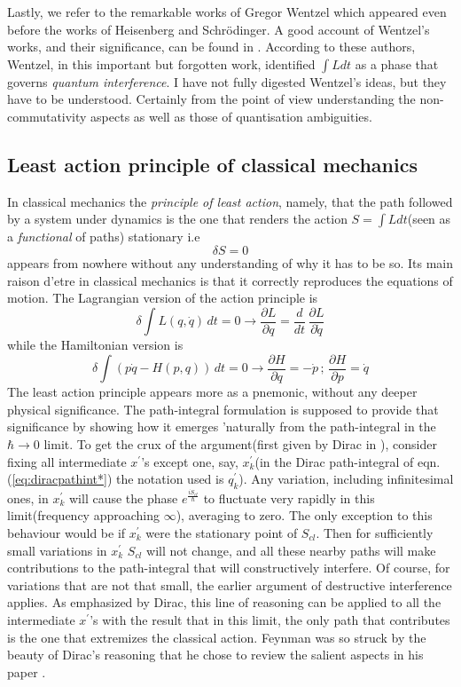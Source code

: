 \documentclass[12pt]{article}
\newcommand{\be}{\begin{equation}}
\newcommand{\ee}{\end{equation}}
\begin{document}
Lastly, we refer to the remarkable works of Gregor Wentzel \cite{wentzel1,wentzel2} which appeared even before the works of Heisenberg and 
Schr\"odinger. A good account of Wentzel's works, and their significance, can be found in \cite{antoci}. According to these authors, Wentzel,
in this important but forgotten work, identified $ \int L dt$ as a phase that governs \emph{quantum interference}. I have not fully
digested Wentzel's ideas, but they have to be understood. Certainly from the point of view understanding the non-commutativity aspects as well
as those of quantisation ambiguities.

\subsection{Least action principle of classical mechanics}
In classical mechanics the {\it principle of least action}, namely, that the path followed by a system under dynamics is the one
that renders the action $S =  \int L dt$(seen as a {\it functional} of paths) stationary i.e
\be
\label{eq:leastactioncm}
\delta S = 0
\ee
appears from nowhere without any understanding of why it has to be so. Its main raison d'etre in classical mechanics is that it correctly
reproduces the equations of motion. The Lagrangian version of the action principle is
\be
\label{eq:eulerlagrange}
\delta  \int L(q,{\dot q})\,dt = 0 \rightarrow \frac{\partial L}{\partial q} = \frac{d}{dt}\,\frac{\partial L}{\partial {\dot q}}
\ee
while the Hamiltonian version is
\be
\label{eq:hamiltoneqns}
\delta  \int (p{\dot q} - H(p,q))\,dt = 0 \rightarrow \frac{\partial H}{\partial q} = - {\dot p}\,;\,\frac{\partial H}{\partial p} = {\dot q}
\ee
The least action principle appears more as a pnemonic, without any deeper physical significance. The path-integral formulation is supposed
to provide that significance by showing how it emerges 'naturally from the path-integral in the $\hbar \rightarrow 0$ limit. To get the
crux of the argument(first given by Dirac in \cite{diracpaper}), consider fixing all intermediate $x^\prime$'s except one, say,
$x_k^\prime$(in the Dirac path-integral of eqn.(\ref{eq:diracpathint*}) the notation used is $q_k^\prime$). 
Any variation,
including infinitesimal ones,
in $x_k^\prime$ will cause the phase $e^{\frac{iS_{cl}}{\hbar}}$ to fluctuate very rapidly in this limit(frequency approaching $\infty$), 
averaging to zero.
The only exception to this behaviour would be if $x_k^\prime$ were the stationary point of $S_{cl}$. Then for sufficiently small variations 
in $x_k^\prime$ 
$S_{cl}$ will not change, and all these nearby paths will make contributions to the path-integral that will constructively interfere. 
Of course, for
variations that are not that small, the earlier argument of destructive interference applies. As emphasized by Dirac, this line of
reasoning can be applied to all the intermediate $x^\prime$'s with the result that in this limit, the only path that contributes is the one that
extremizes the classical action. Feynman was so struck by the beauty of Dirac's reasoning that he chose to review the salient aspects in
his paper \cite{feynpaper}.
\end{document}
